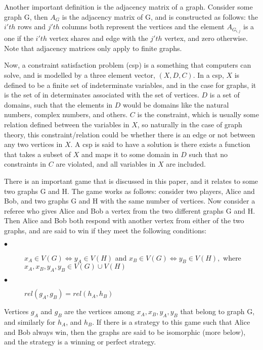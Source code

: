 \documentclass[12pt]{article}
\theoremstyle{definition}
\theoremstyle{proposition}
\theoremstyle{lemma}
\begin{document}
Another important definition is the adjacency matrix of a graph. Consider some graph G, then $A_G$ is the adjacency matrix of G, and is constructed as follows: the $i'th$ rows and $j'th$ columns both represent the vertices and the element $A_{G_{i, j}}$ is a one if the $i'th$ vertex shares and edge with the $j'th$ vertex, and zero otherwise. Note that adjacency matrices only apply to finite graphs.

Now, a constraint satisfaction problem (csp) is a something that computers can solve, and is modelled by a three element vector, $(X, D, C)$. In a csp, $X$ is defined to be a finite set of indeterminate variables, and in the case for graphs, it is the set of in determinates associated with the set of vertices. $D$ is a set of domains, such that the elements in $D$ would be domains like the natural numbers, complex numbers, and others. $C$ is the constraint, which is usually some relation defined between the variables in $X$, so naturally in the case of graph theory, this constraint/relation could be whether there is an edge or not between any two vertices in $X$. A csp is said to have a solution is there exists a function that takes a subset of $X$ and maps it to some domain in $D$ such that no constraints in $C$ are violated, and all variables in $X$ are included.

There is an important game that is discussed in this paper, and it relates to some two graphs G and H. The game works as follows: consider two players, Alice and Bob, and two graphs G and H with the same number of vertices. Now consider a referee who gives Alice and Bob a vertex from the two different graphs G and H. Then Alice and Bob both respond with another vertex from either of the two graphs, and are said to win if they meet the following conditions:
\begin{description}
  \item[$\bullet$] $x_A \in V(G) \Leftrightarrow y_A \in V(H)$ and  $x_B \in V(G)\Leftrightarrow y_B \in V(H), $ where $x_A, x_B, y_A, y_B \in V(G) \cup V(H)$
  \item[$\bullet$] $rel(g_A, g_B) = rel(h_A, h_B)$
\end{description}
Vertices $g_A$ and $g_B$ are the vertices among $x_A, x_B, y_A, y_B$ that belong to graph G, and similarly for $h_A$, and $h_B$.
If there is a strategy to this game such that Alice and Bob always win, then the graphs are said to be isomorphic (more below), and the strategy is a winning or perfect strategy. 
\end{document}
